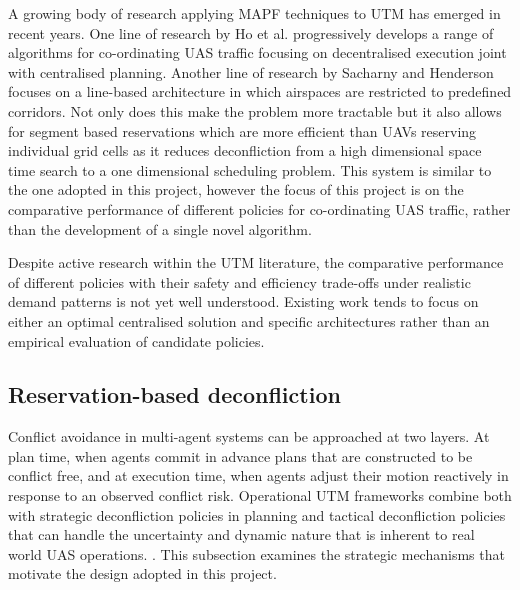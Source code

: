 \vspace{1em}

A growing body of research applying MAPF techniques to UTM has emerged in recent years. One line of research by Ho et al. \cite{ho2019utm, ho2020utm, ho2019cdr} progressively develops a range of algorithms for co-ordinating UAS traffic focusing on decentralised execution joint with centralised planning. Another line of research by Sacharny and Henderson \cite{sacharny2019lanebased} focuses on a line-based architecture in which airspaces are restricted to predefined corridors. Not only does this make the problem more tractable but it also allows for segment based reservations which are more efficient than UAVs reserving individual grid cells as it reduces deconfliction from a high dimensional space time search to a one dimensional scheduling problem. This system is similar to the one adopted in this project, however the focus of this project is on the comparative performance of different policies for co-ordinating UAS traffic, rather than the development of a single novel algorithm. \par

\vspace{1em}

Despite active research within the UTM literature, the comparative performance of different policies with their safety and efficiency trade-offs under realistic demand patterns is not yet well understood. Existing work tends to focus on either an optimal centralised solution and specific architectures rather than an empirical evaluation of candidate policies. \par

\vspace{1em}

\subsection{Reservation-based deconfliction }
\label{sec:reservation}

Conflict avoidance in multi-agent systems can be approached at two layers. At plan time, when agents commit in advance plans that are constructed to be conflict free, and at execution time, when agents adjust their motion reactively in response to an observed conflict risk. Operational UTM frameworks combine both with strategic deconfliction policies in planning and tactical deconfliction policies that can handle the uncertainty and dynamic nature that is inherent to real world UAS operations. \cite{faa2020utmconops}. This subsection examines the strategic mechanisms that motivate the design adopted in this project. \par

